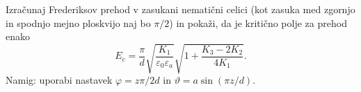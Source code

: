 \begin{definition}
Izračunaj Frederiksov prehod v zasukani nematični celici (kot zasuka med zgornjo in spodnjo 
mejno ploskvijo naj bo $\pi/2$) in pokaži, da je kritično polje za prehod enako
\begin{equation}
E_c =  \frac{\pi}{d}\sqrt{\frac{K_1}{\varepsilon_0\varepsilon_a}}
\sqrt{1 + \frac{K_3-2K_2}{4K_1}}.
\end{equation}
Namig: uporabi nastavek $\varphi = z \pi/2d$ in $\vartheta = a \sin(\pi z/d)$. 
\end{definition}
